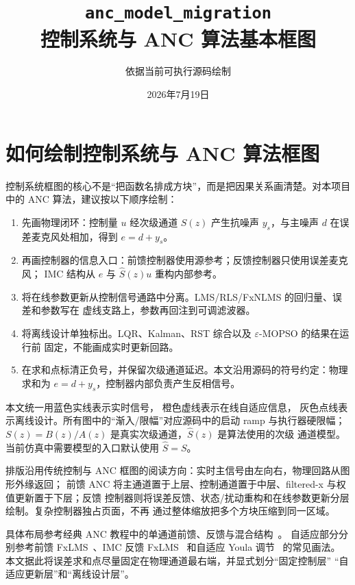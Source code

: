 \documentclass[UTF8,11pt,a4paper]{ctexart}
\title{\texttt{anc\_model\_migration}\\控制系统与 ANC 算法基本框图}
\author{依据当前可执行源码绘制}
\date{2026年7月19日}
\begin{document}
\maketitle

\section{如何绘制控制系统与 ANC 算法框图}

控制系统框图的核心不是“把函数名排成方块”，而是把因果关系画清楚。对本项目中的 ANC
算法，建议按以下顺序绘制：

\begin{enumerate}
  \item 先画物理闭环：控制量 $u$ 经次级通道 $S(z)$ 产生抗噪声 $y_s$，与主噪声
  $d$ 在误差麦克风处相加，得到 $e=d+y_s$。
  \item 再画控制器的信息入口：前馈控制器使用源参考；反馈控制器只使用误差麦克风；
  IMC 结构从 $e$ 与 $\hat S(z)u$ 重构内部参考。
  \item 将在线参数更新从控制信号通路中分离。LMS/RLS/FxNLMS 的回归量、误差和参数写在
  虚线支路上，参数再回注到可调滤波器。
  \item 将离线设计单独标出。LQR、Kalman、RST 综合以及 $\varepsilon$-MOPSO 的结果在运行前
  固定，不能画成实时更新回路。
  \item 在求和点标清正负号，并保留次级通道延迟。本文沿用源码的符号约定：物理求和为
  $e=d+y_s$，控制器内部负责产生反相信号。
\end{enumerate}

本文统一用\textcolor{signalblue}{蓝色实线}表示实时信号，
\textcolor{adaptorange}{橙色虚线}表示在线自适应信息，
\textcolor{offlinegray}{灰色点线}表示离线设计。所有图中的“渐入/限幅”对应源码中的启动
ramp 与执行器硬限幅；$S(z)=B(z)/A(z)$ 是真实次级通道，$\hat S(z)$ 是算法使用的次级
通道模型。当前仿真中需要模型的入口默认使用 $\hat S=S$。

排版沿用传统控制与 ANC 框图的阅读方向：实时主信号由左向右，物理回路从图形外缘返回；
前馈 ANC 将主通道置于上层、控制通道置于中层、filtered-x 与权值更新置于下层；反馈
控制器则将误差反馈、状态/扰动重构和在线参数更新分层绘制。复杂控制器独占页面，不再
通过整体缩放把多个方块压缩到同一区域。

具体布局参考经典 ANC 教程中的单通道前馈、反馈与混合结构~\cite{kuo1999tutorial}。
自适应部分分别参考前馈 FxLMS~\cite{song2019fxlms}、IMC 反馈
FxLMS~\cite{wang2014imc} 和自适应 Youla 调节~\cite{wu2014youla} 的常见画法。
本文据此将误差求和点尽量固定在物理通道最右端，并显式划分“固定控制层”
“自适应更新层”和“离线设计层”。
\end{document}
